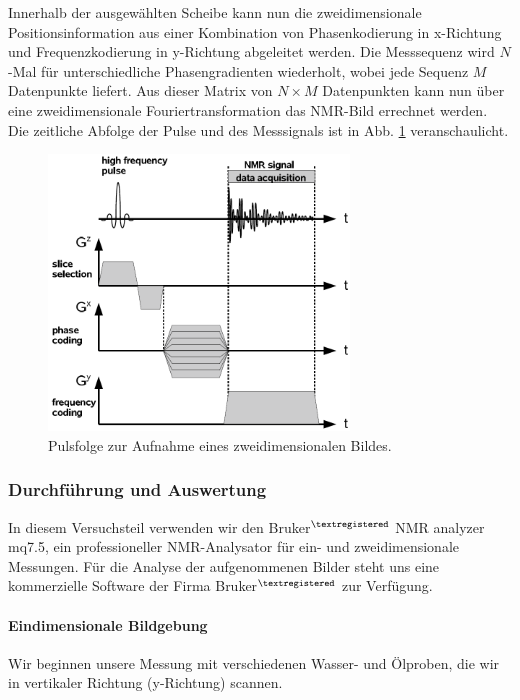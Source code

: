 \documentclass[a4paper]{scrartcl} %
\begin{document}
Innerhalb der ausgewählten Scheibe kann nun die zweidimensionale Positionsinformation aus einer Kombination von Phasenkodierung in x-Richtung und Frequenzkodierung in y-Richtung abgeleitet werden. Die Messsequenz wird $N$-Mal für unterschiedliche Phasengradienten wiederholt, wobei jede Sequenz $M$ Datenpunkte liefert. Aus dieser Matrix von $N \times M$ Datenpunkten kann nun über eine zweidimensionale Fouriertransformation das NMR-Bild errechnet werden. Die zeitliche Abfolge der Pulse und des Messsignals ist in Abb. \ref{fig:2d_imaging} veranschaulicht.

\begin{figure}[H]
	\centering
	\includegraphics[width=80mm]{./Resources/2d_imaging.png}
	\caption{Pulsfolge zur Aufnahme eines zweidimensionalen Bildes.}
	\label{fig:2d_imaging}
\end{figure}

\subsubsection{Durchführung und Auswertung}

In diesem Versuchsteil verwenden wir den \textsf{Bruker$^{\textregistered}$ NMR analyzer mq7.5}, ein professioneller NMR-Analysator für ein- und zweidimensionale Messungen. Für die Analyse der aufgenommenen Bilder steht uns eine kommerzielle Software der Firma \textsf{Bruker$^{\textregistered}$} zur Verfügung.

\paragraph{Eindimensionale Bildgebung}

Wir beginnen unsere Messung mit verschiedenen Wasser- und Ölproben, die wir in vertikaler Richtung (y-Richtung) scannen.
\end{document}
